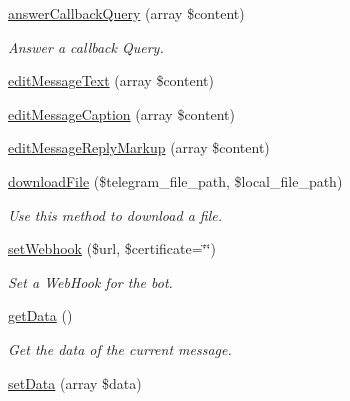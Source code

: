\begin{DoxyCompactItemize}
\hyperlink{class_telegram_a55fa1d6bbcca385e333b402894e8ca37}{answer\+Callback\+Query} (array \$content)
\begin{DoxyCompactList}\small\item\em Answer a callback Query. \end{DoxyCompactList}\item 
\hyperlink{class_telegram_afbc4f6fd5f28a20e1bea0b083863b688}{edit\+Message\+Text} (array \$content)
\item 
\hyperlink{class_telegram_a3531b07c9dc7afb693c6e956e5debdad}{edit\+Message\+Caption} (array \$content)
\item 
\hyperlink{class_telegram_acd615562e6a6eeeb3d8a825eb03e3e5f}{edit\+Message\+Reply\+Markup} (array \$content)
\item 
\hyperlink{class_telegram_af08c6bc7982d71857f05c0756221a703}{download\+File} (\$telegram\+\_\+file\+\_\+path, \$local\+\_\+file\+\_\+path)
\begin{DoxyCompactList}\small\item\em Use this method to download a file. \end{DoxyCompactList}\item 
\hyperlink{class_telegram_ae94b55864cae3e7751e7293585eec9f5}{set\+Webhook} (\$url, \$certificate=\char`\"{}\char`\"{})
\begin{DoxyCompactList}\small\item\em Set a Web\+Hook for the bot. \end{DoxyCompactList}\item 
\hyperlink{class_telegram_a81a67162a6288d78fc4c55283325f0b4}{get\+Data} ()
\begin{DoxyCompactList}\small\item\em Get the data of the current message. \end{DoxyCompactList}\item 
\hypertarget{class_telegram_a87449bdd364c33ff024d32896342bf31}{}\hyperlink{class_telegram_a87449bdd364c33ff024d32896342bf31}{set\+Data} (array \$data)\label{class_telegram_a87449bdd364c33ff024d32896342bf31}


\end{DoxyCompactItemize}
